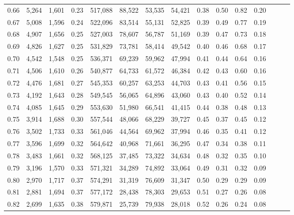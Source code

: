 \begin{tabular}{rrrrrrrrrrrrrrr}
0.66 &  5,264 &  1,601 &  0.23 &  517,088 &   88,522 &   53,535 &   54,421 &  0.38 &  0.50 &  0.82 &      0.20 \\
0.67 &  5,008 &  1,596 &  0.24 &  522,096 &   83,514 &   55,131 &   52,825 &  0.39 &  0.49 &  0.77 &      0.19 \\
0.68 &  4,907 &  1,656 &  0.25 &  527,003 &   78,607 &   56,787 &   51,169 &  0.39 &  0.47 &  0.73 &      0.18 \\
0.69 &  4,826 &  1,627 &  0.25 &  531,829 &   73,781 &   58,414 &   49,542 &  0.40 &  0.46 &  0.68 &      0.17 \\
0.70 &  4,542 &  1,548 &  0.25 &  536,371 &   69,239 &   59,962 &   47,994 &  0.41 &  0.44 &  0.64 &      0.16 \\
0.71 &  4,506 &  1,610 &  0.26 &  540,877 &   64,733 &   61,572 &   46,384 &  0.42 &  0.43 &  0.60 &      0.16 \\
0.72 &  4,476 &  1,681 &  0.27 &  545,353 &   60,257 &   63,253 &   44,703 &  0.43 &  0.41 &  0.56 &      0.15 \\
0.73 &  4,192 &  1,643 &  0.28 &  549,545 &   56,065 &   64,896 &   43,060 &  0.43 &  0.40 &  0.52 &      0.14 \\
0.74 &  4,085 &  1,645 &  0.29 &  553,630 &   51,980 &   66,541 &   41,415 &  0.44 &  0.38 &  0.48 &      0.13 \\
0.75 &  3,914 &  1,688 &  0.30 &  557,544 &   48,066 &   68,229 &   39,727 &  0.45 &  0.37 &  0.45 &      0.12 \\
0.76 &  3,502 &  1,733 &  0.33 &  561,046 &   44,564 &   69,962 &   37,994 &  0.46 &  0.35 &  0.41 &      0.12 \\
0.77 &  3,596 &  1,699 &  0.32 &  564,642 &   40,968 &   71,661 &   36,295 &  0.47 &  0.34 &  0.38 &      0.11 \\
0.78 &  3,483 &  1,661 &  0.32 &  568,125 &   37,485 &   73,322 &   34,634 &  0.48 &  0.32 &  0.35 &      0.10 \\
0.79 &  3,196 &  1,570 &  0.33 &  571,321 &   34,289 &   74,892 &   33,064 &  0.49 &  0.31 &  0.32 &      0.09 \\
0.80 &  2,970 &  1,717 &  0.37 &  574,291 &   31,319 &   76,609 &   31,347 &  0.50 &  0.29 &  0.29 &      0.09 \\
0.81 &  2,881 &  1,694 &  0.37 &  577,172 &   28,438 &   78,303 &   29,653 &  0.51 &  0.27 &  0.26 &      0.08 \\
0.82 &  2,699 &  1,635 &  0.38 &  579,871 &   25,739 &   79,938 &   28,018 &  0.52 &  0.26 &  0.24 &      0.08 \\

\end{tabular}
